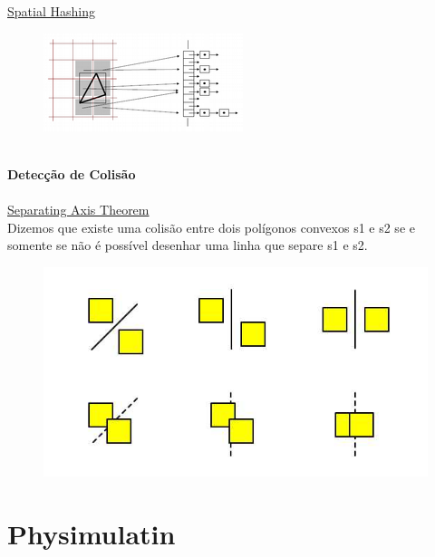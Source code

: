 \documentclass[plainboxedsections]{sciposter}
\begin{document}
\begin{multicols}{2}
\begin{figure}
  \end{figure}
  \underline{Spatial Hashing}\\
  \begin{figure}
    \includegraphics[scale=3]{sh.png}
  \end{figure}
  \\[1ex]
  \textbf{Detecção de Colisão} \\
  \\[1ex]
  \underline{Separating Axis Theorem}
  \\[1ex]
  Dizemos que existe uma colisão entre dois polígonos convexos s1 e s2 se e somente se não é possível desenhar uma linha que separe s1 e s2.
  \begin{figure}
    \centering
    \includegraphics[scale=1.5]{SAT.jpg}
  \end{figure}

  \section*{Physimulatin}
\end{multicols}
\end{document}
